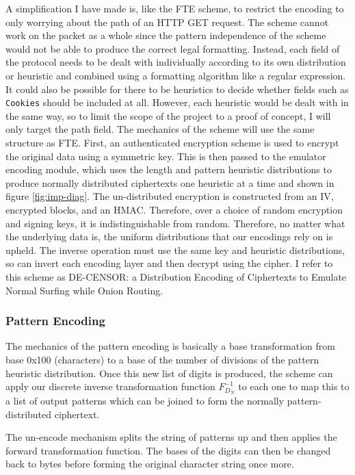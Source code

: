 \documentclass[ %
                    author={Samuel Russell},
                supervisor={Prof. Bogdan Warinschi},
                    degree={MEng},
                     title={Innocuous Ciphertexts},
                  subtitle={The DE-CENSOR Scheme},
                      type={Research},
                      year={2018} ]{dissertation}
\begin{document}
A simplification I have made is, like the FTE scheme, to restrict the encoding to only worrying about the path of an HTTP GET request.
The scheme cannot work on the packet as a whole since the pattern independence of the scheme would not be able to produce the correct legal formatting.
Instead, each field of the protocol needs to be dealt with individually according to its own distribution or heuristic and combined using a formatting algorithm like a regular expression.
It could also be possible for there to be heuristics to decide whether fields such as \texttt{Cookies} should be included at all.
However, each heuristic would be dealt with in the same way, so to limit the scope of the project to a proof of concept, I will only target the path field.
The mechanics of the scheme will use the same structure as FTE. First, an authenticated encryption scheme is used to encrypt the original data using a symmetric key.
This is then passed to the emulator encoding module, which uses the length and pattern heuristic distributions to produce normally distributed ciphertexts one heuristic at a time and shown in figure \ref{fig:imp-diag}.
The un-distributed encryption is constructed from an IV, encrypted blocks, and an HMAC. Therefore, over a choice of random encryption and signing keys, it is indistinguishable from random.
Therefore, no matter what the underlying data is, the uniform distributions that our encodings rely on is upheld.
The inverse operation must use the same key and heuristic distributions, so can invert each encoding layer and then decrypt using the cipher.
I refer to this scheme as DE-CENSOR: a Distribution Encoding of Ciphertexts to Emulate Normal Surfing while Onion Routing.

\subsubsection{Pattern Encoding}

The mechanics of the pattern encoding is basically a base transformation from base 0x100 (characters) to a base of the number of divisions of the pattern heuristic distribution.
Once this new list of digits is produced, the scheme can apply our discrete inverse transformation function $F^{-1}_{D_N}$ to each one to map this to a list of output patterns which can be joined to form the normally pattern-distributed ciphertext.

The un-encode mechanism splits the string of patterns up and then applies the forward transformation function. The bases of the digits can then be changed back to bytes before forming the original character string once more.
\end{document}
